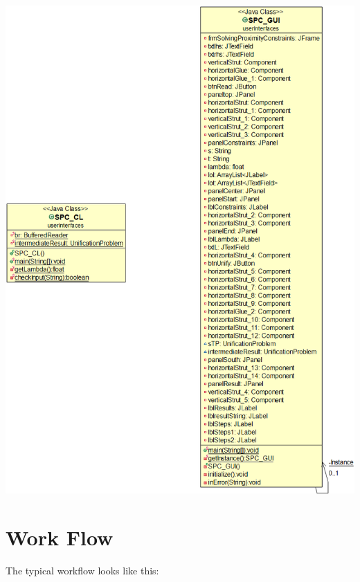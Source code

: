 \documentclass{article}
\begin{document}
\includegraphics[scale=0.5]{UIModel}


\section{Work Flow}
The typical workflow looks like this:

%




%
\end{document}
